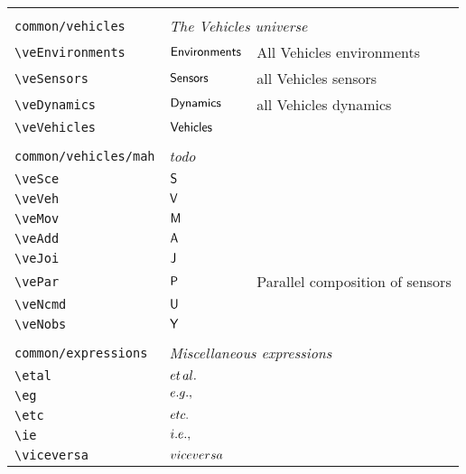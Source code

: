\begin{longtable}{lll}
  &  & \\ 
 {\color[rgb]{0.5,0.5,0.5}\texttt{common/vehicles}} & \multicolumn{2}{l}{\emph{The Vehicles universe}}\\ 
 \hline
{\color[rgb]{0.5,0.5,0.5}\texttt{\textbackslash veEnvironments}} & $\mathsf{Environments}$ &  All Vehicles environments \\ 
 {\color[rgb]{0.5,0.5,0.5}\texttt{\textbackslash veSensors}} & $\mathsf{Sensors}$ &  all Vehicles sensors\\ 
 {\color[rgb]{0.5,0.5,0.5}\texttt{\textbackslash veDynamics}} & $\mathsf{Dynamics}$ &  all Vehicles dynamics\\ 
 {\color[rgb]{0.5,0.5,0.5}\texttt{\textbackslash veVehicles}} & $\mathsf{Vehicles}$ & \\ 
  &  & \\ 
 {\color[rgb]{0.5,0.5,0.5}\texttt{common/vehicles/mah}} & \multicolumn{2}{l}{\emph{todo}}\\ 
 \hline
{\color[rgb]{0.5,0.5,0.5}\texttt{\textbackslash veSce}} & $\mathsf{S}$ & \\ 
 {\color[rgb]{0.5,0.5,0.5}\texttt{\textbackslash veVeh}} & $\mathsf{V}$ & \\ 
 {\color[rgb]{0.5,0.5,0.5}\texttt{\textbackslash veMov}} & $\mathsf{M}$ & \\ 
 {\color[rgb]{0.5,0.5,0.5}\texttt{\textbackslash veAdd}} & $\mathsf{A}$ & \\ 
 {\color[rgb]{0.5,0.5,0.5}\texttt{\textbackslash veJoi}} & $\mathsf{J}$ & \\ 
 {\color[rgb]{0.5,0.5,0.5}\texttt{\textbackslash vePar}} & $\mathsf{P}$ &  Parallel composition of sensors\\ 
 {\color[rgb]{0.5,0.5,0.5}\texttt{\textbackslash veNcmd}} & $\mathsf{U}$ & \\ 
 {\color[rgb]{0.5,0.5,0.5}\texttt{\textbackslash veNobs}} & $\mathsf{Y}$ & \\ 
  &  & \\ 
 {\color[rgb]{0.5,0.5,0.5}\texttt{common/expressions}} & \multicolumn{2}{l}{\emph{Miscellaneous expressions}}\\ 
 \hline
{\color[rgb]{0.5,0.5,0.5}\texttt{\textbackslash etal}} & ${et\,al.}$ & \\ 
 {\color[rgb]{0.5,0.5,0.5}\texttt{\textbackslash eg}} & ${e.g.},$ & \\ 
 {\color[rgb]{0.5,0.5,0.5}\texttt{\textbackslash etc}} & ${etc.}$ & \\ 
 {\color[rgb]{0.5,0.5,0.5}\texttt{\textbackslash ie}} & ${i.e.},$ & \\ 
 {\color[rgb]{0.5,0.5,0.5}\texttt{\textbackslash viceversa}} & ${vice versa}$ & \\ 

\end{longtable}
